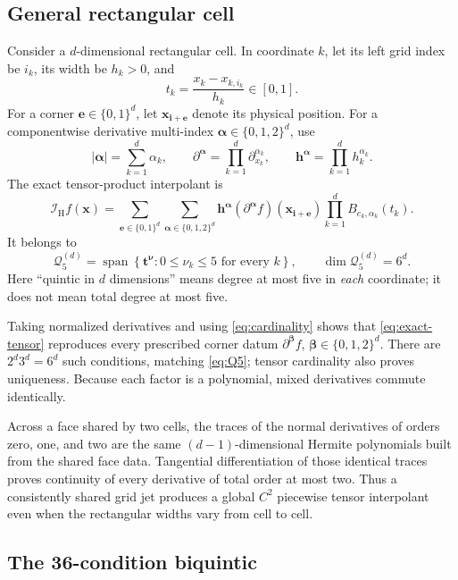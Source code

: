 \documentclass[11pt]{article}
\newcommand{\Q}{\mathcal{Q}}
\newcommand{\I}{\mathcal{I}}
\newcommand{\be}{\boldsymbol{e}}
\newcommand{\bi}{\boldsymbol{i}}
\newcommand{\bt}{\boldsymbol{t}}
\newcommand{\bx}{\boldsymbol{x}}
\newcommand{\balpha}{\boldsymbol{\alpha}}
\newcommand{\bbeta}{\boldsymbol{\beta}}
\begin{document}
\subsection{General rectangular cell}

Consider a $d$-dimensional rectangular cell.  In coordinate $k$, let its
left grid index be $i_k$, its width be $h_k>0$, and
\[
  t_k=\frac{x_k-x_{k,i_k}}{h_k}\in[0,1].
\]
For a corner \(\be\in\{0,1\}^d\), let \(\bx_{\bi+\be}\) denote its physical
position.  For a componentwise derivative multi-index
\(\balpha\in\{0,1,2\}^d\), use
\[
  |\balpha|=\sum_{k=1}^d\alpha_k,\qquad
  \partial^{\balpha}=\prod_{k=1}^d\partial_{x_k}^{\alpha_k},\qquad
    \boldsymbol{h}^{\balpha}=\prod_{k=1}^d h_k^{\alpha_k}.
\]
The exact tensor-product interpolant is
\begin{equation}
  \boxed{
  \I_{\mathrm H}f(\bx)=
  \sum_{\be\in\{0,1\}^d}
  \sum_{\balpha\in\{0,1,2\}^d}
  \boldsymbol{h}^{\balpha}
  (\partial^{\balpha}f)(\bx_{\bi+\be})
  \prod_{k=1}^d B_{e_k,\alpha_k}(t_k).}
  \label{eq:exact-tensor}
\end{equation}
It belongs to
\begin{equation}
  \Q_5^{(d)}
  =\operatorname{span}\left\{
    \bt^{\boldsymbol{\nu}}:0\leq\nu_k\leq5
    \text{ for every }k\right\},
  \qquad \dim\Q_5^{(d)}=6^d.
  \label{eq:Q5}
\end{equation}
Here ``quintic in $d$ dimensions'' means degree at most five in \emph{each}
coordinate; it does not mean total degree at most five.

Taking normalized derivatives and using \eqref{eq:cardinality} shows that
\eqref{eq:exact-tensor} reproduces every prescribed corner datum
\(\partial^{\bbeta}f\), \(\bbeta\in\{0,1,2\}^d\).  There are
$2^d3^d=6^d$ such conditions, matching \eqref{eq:Q5}; tensor cardinality
also proves uniqueness.  Because each factor is a polynomial, mixed
derivatives commute identically.

Across a face shared by two cells, the traces of the normal derivatives of
orders zero, one, and two are the same $(d-1)$-dimensional Hermite
polynomials built from the shared face data.  Tangential differentiation of
those identical traces proves continuity of every derivative of total order
at most two.  Thus a consistently shared grid jet produces a global $C^2$
piecewise tensor interpolant even when the rectangular widths vary from cell
to cell.

\subsection{The 36-condition biquintic}
\end{document}
